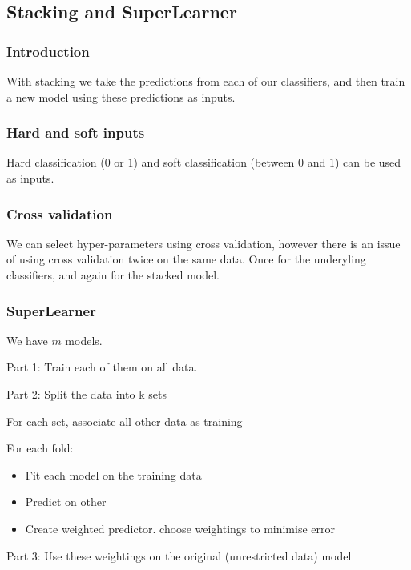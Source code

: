 
\subsection{Stacking and SuperLearner}

\subsubsection{Introduction}

With stacking we take the predictions from each of our classifiers, and then train a new model using these predictions as inputs.

\subsubsection{Hard and soft inputs}

Hard classification (\(0\) or \(1\)) and soft classification (between \(0\) and \(1\)) can be used as inputs.

\subsubsection{Cross validation}

We can select hyper-parameters using cross validation, however there is an issue of using cross validation twice on the same data. Once for the underyling classifiers, and again for the stacked model.

\subsubsection{SuperLearner}

We have \(m\) models.

Part 1: Train each of them on all data.

Part 2: Split the data into k sets

For each set, associate all other data as training

For each fold:
\begin{itemize}
\item Fit each model on the training data
\item Predict on other
\item Create weighted predictor. choose weightings to minimise error
\end{itemize}

Part 3: Use these weightings on the original (unrestricted data) model

